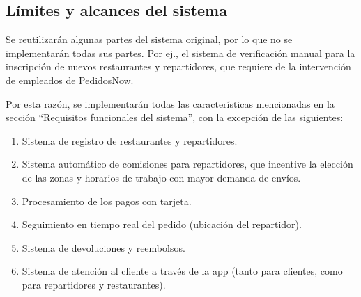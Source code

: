 \subsection{Límites y alcances del sistema}

Se reutilizarán algunas partes del sistema original, por lo que no se implementarán todas sus partes. Por ej., el sistema de verificación manual para la inscripción de nuevos restaurantes y repartidores, que requiere de la intervención de empleados de PedidosNow.

Por esta razón, se implementarán todas las características mencionadas en la sección ``Requisitos funcionales del sistema'', con la excepción de las siguientes:

\begin{enumerate}
    \item Sistema de registro de restaurantes y repartidores.
    \item Sistema automático de comisiones para repartidores, que incentive la elección de las zonas y horarios de trabajo con mayor demanda de envíos.
    \item Procesamiento de los pagos con tarjeta.
    \item Seguimiento en tiempo real del pedido (ubicación del repartidor).
    \item Sistema de devoluciones y reembolsos.
    \item Sistema de atención al cliente a través de la app (tanto para clientes, como para repartidores y restaurantes).
\end{enumerate}
